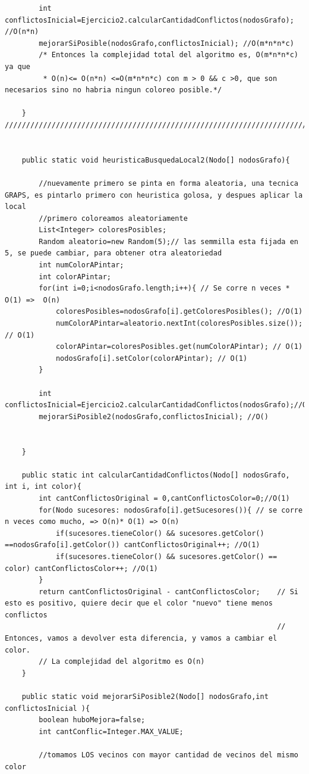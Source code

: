 \documentclass[a4paper]{article}
\begin{document}
\begin{lstlisting}
		int conflictosInicial=Ejercicio2.calcularCantidadConflictos(nodosGrafo); //O(n*n)
		mejorarSiPosible(nodosGrafo,conflictosInicial); //O(m*n*n*c)
		/* Entonces la complejidad total del algoritmo es, O(m*n*n*c) ya que 
		 * O(n)<= O(n*n) <=O(m*n*n*c) con m > 0 && c >0, que son necesarios sino no habria ningun coloreo posible.*/
		
	}
////////////////////////////////////////////////////////////////////////////////////////
	
	
	public static void heuristicaBusquedaLocal2(Nodo[] nodosGrafo){
		
		//nuevamente primero se pinta en forma aleatoria, una tecnica GRAPS, es pintarlo primero con heuristica golosa, y despues aplicar la local
		//primero coloreamos aleatoriamente 
		List<Integer> coloresPosibles;
		Random aleatorio=new Random(5);// las semmilla esta fijada en 5, se puede cambiar, para obtener otra aleatoriedad
		int numColorAPintar;
		int colorAPintar;
		for(int i=0;i<nodosGrafo.length;i++){ // Se corre n veces * O(1) =>  O(n)
			coloresPosibles=nodosGrafo[i].getColoresPosibles(); //O(1)
			numColorAPintar=aleatorio.nextInt(coloresPosibles.size()); // O(1)
 			colorAPintar=coloresPosibles.get(numColorAPintar); // O(1)
			nodosGrafo[i].setColor(colorAPintar); // O(1)
		}
		
		int conflictosInicial=Ejercicio2.calcularCantidadConflictos(nodosGrafo);//O(n*n)
		mejorarSiPosible2(nodosGrafo,conflictosInicial); //O()
		
		
	}
	
	public static int calcularCantidadConflictos(Nodo[] nodosGrafo, int i, int color){
		int cantConflictosOriginal = 0,cantConflictosColor=0;//O(1)
		for(Nodo sucesores: nodosGrafo[i].getSucesores()){ // se corre n veces como mucho, => O(n)* O(1) => O(n)
			if(sucesores.tieneColor() && sucesores.getColor() ==nodosGrafo[i].getColor()) cantConflictosOriginal++; //O(1)
			if(sucesores.tieneColor() && sucesores.getColor() == color) cantConflictosColor++; //O(1)
		}
		return cantConflictosOriginal - cantConflictosColor;	// Si esto es positivo, quiere decir que el color "nuevo" tiene menos conflictos
																// Entonces, vamos a devolver esta diferencia, y vamos a cambiar el color.
		// La complejidad del algoritmo es O(n)
	}
	
	public static void mejorarSiPosible2(Nodo[] nodosGrafo,int conflictosInicial ){
		boolean huboMejora=false;
		int cantConflic=Integer.MAX_VALUE;
		
		//tomamos LOS vecinos con mayor cantidad de vecinos del mismo color
		

\end{lstlisting}
\end{document}
